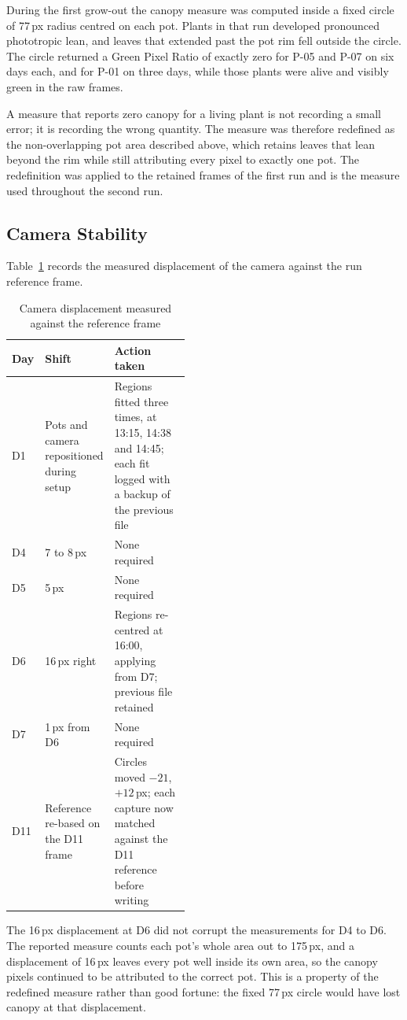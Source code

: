 During the first grow-out the canopy measure was computed inside a fixed
circle of 77\,px radius centred on each pot. Plants in that run developed
pronounced phototropic lean, and leaves that extended past the pot rim fell
outside the circle. The circle returned a Green Pixel Ratio of exactly zero
for P-05 and P-07 on six days each, and for P-01 on three days, while those
plants were alive and visibly green in the raw frames.

A measure that reports zero canopy for a living plant is not recording a
small error; it is recording the wrong quantity. The measure was therefore
redefined as the non-overlapping pot area described above, which retains
leaves that lean beyond the rim while still attributing every pixel to exactly
one pot. The redefinition was applied to the retained frames of the first run
and is the measure used throughout the second run.

\subsection{Camera Stability}

Table~\ref{tab:roi_drift} records the measured displacement of the camera
against the run reference frame.

\begin{table}[ht]
\centering
\caption{Camera displacement measured against the reference frame}
\label{tab:roi_drift}
\begin{tabular}{llp{0.45\linewidth}}
\toprule
\textbf{Day} & \textbf{Shift} & \textbf{Action taken} \\
\midrule
D1 & Pots and camera repositioned during setup & Regions fitted three times, at 13:15, 14:38 and 14:45; each fit logged with a backup of the previous file \\
D4 & 7 to 8\,px & None required \\
D5 & 5\,px & None required \\
D6 & 16\,px right & Regions re-centred at 16:00, applying from D7; previous file retained \\
D7 & 1\,px from D6 & None required \\
D11 & Reference re-based on the D11 frame & Circles moved $-21$, $+12$\,px; each capture now matched against the D11 reference before writing \\
\bottomrule
\end{tabular}
\end{table}

The 16\,px displacement at D6 did not corrupt the measurements for D4 to D6.
The reported measure counts each pot's whole area out to 175\,px, and a
displacement of 16\,px leaves every pot well inside its own area, so the
canopy pixels continued to be attributed to the correct pot. This is a
property of the redefined measure rather than good fortune: the fixed 77\,px
circle would have lost canopy at that displacement.

